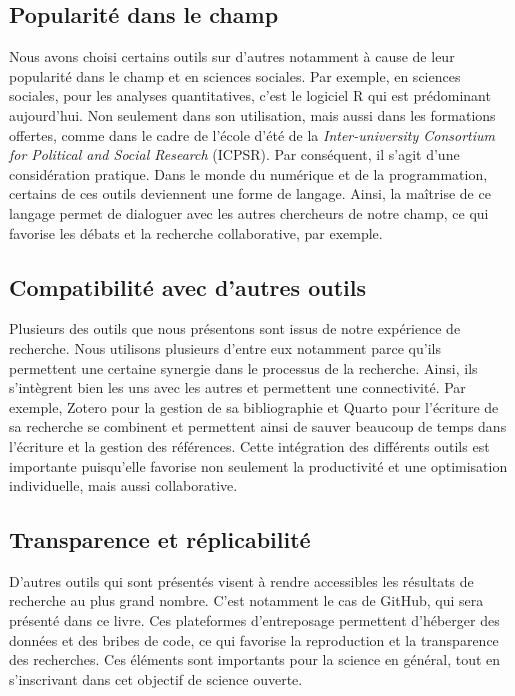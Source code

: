 \documentclass[
  letterpaper,
  DIV=11,
  numbers=noendperiod]{scrreprt}
\begin{document}
\hypertarget{popularituxe9-dans-le-champ}{%
\subsection{Popularité dans le
champ}\label{popularituxe9-dans-le-champ}}

Nous avons choisi certains outils sur d'autres notamment à cause de leur
popularité dans le champ et en sciences sociales. Par exemple, en
sciences sociales, pour les analyses quantitatives, c'est le logiciel R
qui est prédominant aujourd'hui. Non seulement dans son utilisation,
mais aussi dans les formations offertes, comme dans le cadre de l'école
d'été de la \emph{Inter-university Consortium for Political and Social
Research} (ICPSR). Par conséquent, il s'agit d'une considération
pratique. Dans le monde du numérique et de la programmation, certains de
ces outils deviennent une forme de langage. Ainsi, la maîtrise de ce
langage permet de dialoguer avec les autres chercheurs de notre champ,
ce qui favorise les débats et la recherche collaborative, par exemple.

\hypertarget{compatibilituxe9-avec-dautres-outils}{%
\subsection{Compatibilité avec d'autres
outils}\label{compatibilituxe9-avec-dautres-outils}}

Plusieurs des outils que nous présentons sont issus de notre expérience
de recherche. Nous utilisons plusieurs d'entre eux notamment parce
qu'ils permettent une certaine synergie dans le processus de la
recherche. Ainsi, ils s'intègrent bien les uns avec les autres et
permettent une connectivité. Par exemple, Zotero pour la gestion de sa
bibliographie et Quarto pour l'écriture de sa recherche se combinent et
permettent ainsi de sauver beaucoup de temps dans l'écriture et la
gestion des références. Cette intégration des différents outils est
importante puisqu'elle favorise non seulement la productivité et une
optimisation individuelle, mais aussi collaborative.

\hypertarget{transparence-et-ruxe9plicabilituxe9}{%
\subsection{Transparence et
réplicabilité}\label{transparence-et-ruxe9plicabilituxe9}}

D'autres outils qui sont présentés visent à rendre accessibles les
résultats de recherche au plus grand nombre. C'est notamment le cas de
GitHub, qui sera présenté dans ce livre. Ces plateformes d'entreposage
permettent d'héberger des données et des bribes de code, ce qui favorise
la reproduction et la transparence des recherches. Ces éléments sont
importants pour la science en général, tout en s'inscrivant dans cet
objectif de science ouverte.
\end{document}
